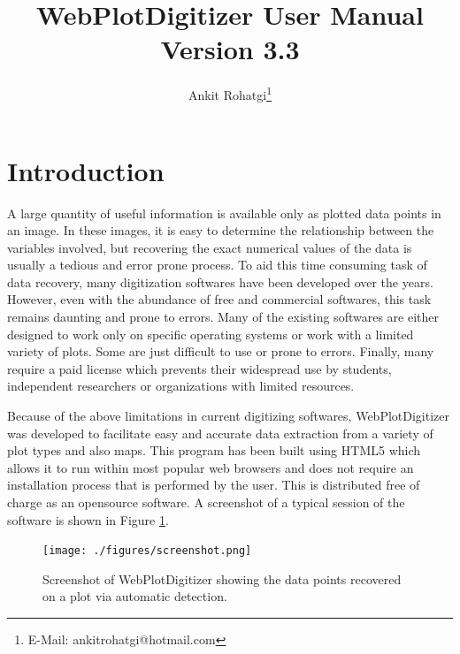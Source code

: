 \documentclass[letterpaper, 10pt]{article}
\begin{document}
\title{WebPlotDigitizer User Manual\\ Version 3.3}
\author{Ankit Rohatgi\footnote{E-Mail: ankitrohatgi@hotmail.com}}
\maketitle
\tableofcontents
\newpage
\section{Introduction}
A large quantity of useful information is available only as plotted data points in an image. In these images, it is easy to determine the relationship between the variables involved, but recovering the exact numerical values of the data is usually a tedious and error prone process. To aid this time consuming task of data recovery, many digitization softwares have been developed over the years. However, even with the abundance of free and commercial softwares, this task remains daunting and prone to errors. Many of the existing softwares are either designed to work only on specific operating systems or work with a limited variety of plots. Some are just difficult to use or prone to errors. Finally, many require a paid license which prevents their widespread use by students, independent researchers or organizations with limited resources.

Because of the above limitations in current digitizing softwares, WebPlotDigitizer was developed to facilitate easy and accurate data extraction from a variety of plot types and also maps. This program has been built using HTML5 which allows it to run within most popular web browsers and does not require an installation process that is performed by the user. This is distributed free of charge as an opensource software. A screenshot of a typical session of the software is shown in Figure \ref{fig:screenshot}.

\begin{figure}
\begin{center}
\texttt{[image: ./figures/screenshot.png]}
\caption{Screenshot of WebPlotDigitizer showing the data points recovered on a plot via automatic detection.}
\label{fig:screenshot}
\end{center}
\end{figure}
\end{document}
